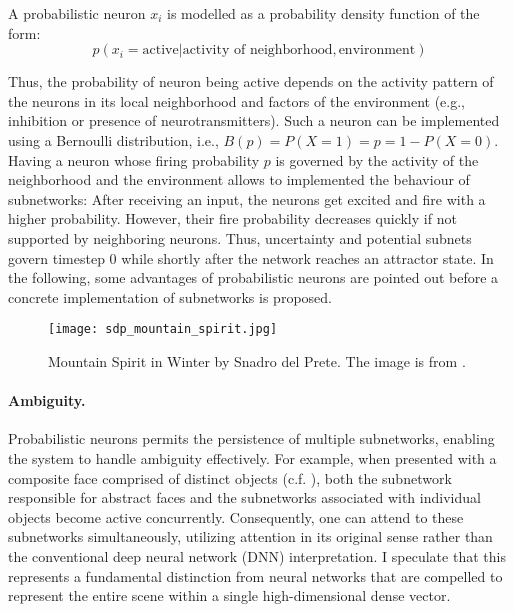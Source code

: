 A probabilistic neuron $x_i$ is modelled as a probability density function of the form:
\begin{equation}
    p(x_i = \text{active} | \text{activity of neighborhood}, \text{environment}) 
\end{equation}

Thus, the probability of neuron being active depends on the activity pattern of the neurons in its local neighborhood and factors of the environment (e.g., inhibition or presence of neurotransmitters).
Such a neuron can be implemented using a Bernoulli distribution, i.e., $B(p) = P(X = 1) = p = 1 - P(X=0)$. Having a neuron whose firing probability $p$ is governed by the activity of the neighborhood and the environment allows to implemented the behaviour of subnetworks: After receiving an input, the neurons get excited and fire with a higher probability. However, their fire probability decreases quickly if not supported by neighboring neurons. Thus, uncertainty and potential subnets govern timestep 0 while shortly after the network reaches an attractor state. In the following, some advantages of probabilistic neurons are pointed out before a concrete implementation of subnetworks is proposed.


\begin{figure}[h]
    \centering
    \texttt{[image: sdp\_mountain\_spirit.jpg]}
    \caption[Mountain Spirit in Winter by Snadro del Prete]{Mountain Spirit in Winter by Snadro del Prete. The image is from .}
\end{figure}


\paragraph{Ambiguity.} Probabilistic neurons permits the persistence of multiple subnetworks, enabling the system to handle ambiguity effectively. For example, when presented with a composite face comprised of distinct objects (c.f. ), both the subnetwork responsible for abstract faces and the subnetworks associated with individual objects become active concurrently. Consequently, one can attend to these subnetworks simultaneously, utilizing attention in its original sense rather than the conventional deep neural network (DNN) interpretation. I speculate that this represents a fundamental distinction from neural networks that are compelled to represent the entire scene within a single high-dimensional dense vector.

